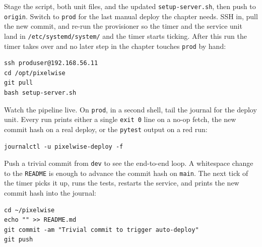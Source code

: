 Stage the script, both unit files, and the updated
\texttt{setup-server.sh}, then push to \texttt{origin}.
Switch to \texttt{prod} for the last manual deploy the chapter needs.
SSH in, pull the new commit, and re-run the provisioner so the timer
and the service unit land in \texttt{/etc/systemd/system/} and the
timer starts ticking.
After this run the timer takes over and no later step in the chapter
touches \texttt{prod} by hand:

\begin{verbatim}
ssh produser@192.168.56.11
cd /opt/pixelwise
git pull
bash setup-server.sh
\end{verbatim}





Watch the pipeline live.
On \texttt{prod}, in a second shell, tail the journal for the
deploy unit.
Every run prints either a single \texttt{exit 0} line on a no-op
fetch, the new commit hash on a real deploy, or the \texttt{pytest} output
on a red run:

\begin{verbatim}
journalctl -u pixelwise-deploy -f
\end{verbatim}



Push a trivial commit from \texttt{dev} to see the end-to-end loop.
A whitespace change to the \texttt{README} is enough to advance the
commit hash on \texttt{main}.
The next tick of the timer picks it up, runs the tests, restarts
the service, and prints the new commit hash into the journal:

\begin{verbatim}
cd ~/pixelwise
echo "" >> README.md
git commit -am "Trivial commit to trigger auto-deploy"
git push
\end{verbatim}



